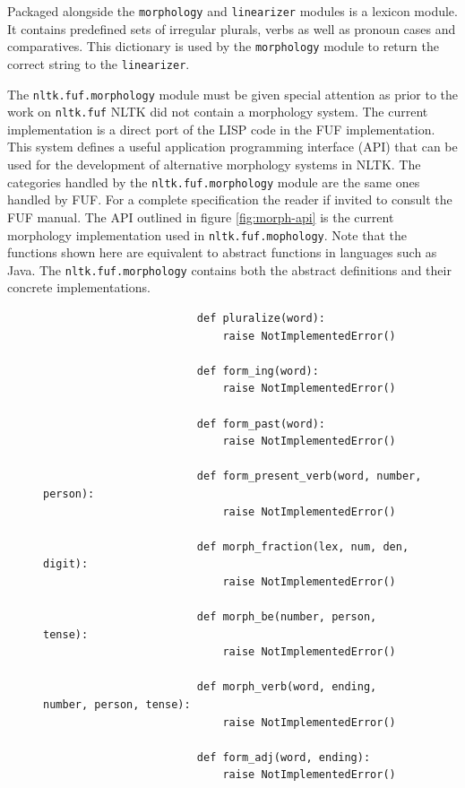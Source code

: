 \documentclass[12pt]{article}
\begin{document}
{Packaged alongside
the \texttt{morphology} and \texttt{linearizer} modules is a lexicon module. It contains predefined sets of 
irregular plurals, verbs as well as pronoun cases and comparatives. This dictionary is used
by the \texttt{morphology} module to return the correct string to the \texttt{linearizer}. 

The \texttt{nltk.fuf.morphology} module must be given special attention as prior to the work
on \texttt{nltk.fuf} NLTK did not contain a morphology system. The current implementation is 
a direct port of the LISP code in the FUF implementation. This system defines a useful application
programming interface (API) that can be used for the development of alternative morphology systems in NLTK.
The categories handled by the \texttt{nltk.fuf.morphology} module are the same ones handled by FUF. 
For a complete specification the reader if invited to consult the FUF manual.
The API outlined in figure \ref{fig:morph-api} is the current morphology implementation used 
in \texttt{nltk.fuf.mophology}. Note that the functions shown here are equivalent to 
abstract functions in languages such as Java. The \texttt{nltk.fuf.morphology} 
contains both the abstract definitions and their concrete implementations.

\begin{figure}[h!]
    {\scriptsize
\begin{verbatim}
                        def pluralize(word):
                            raise NotImplementedError()

                        def form_ing(word):
                            raise NotImplementedError()

                        def form_past(word):
                            raise NotImplementedError()

                        def form_present_verb(word, number, person):
                            raise NotImplementedError()

                        def morph_fraction(lex, num, den, digit):
                            raise NotImplementedError()

                        def morph_be(number, person, tense):
                            raise NotImplementedError()

                        def morph_verb(word, ending, number, person, tense):
                            raise NotImplementedError()

                        def form_adj(word, ending):
                            raise NotImplementedError()


\end{verbatim}}
\end{figure}}
\end{document}
